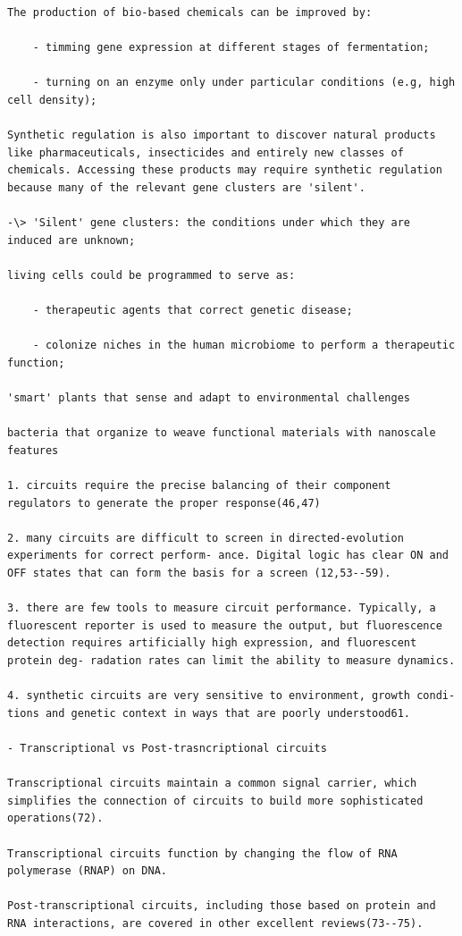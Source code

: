 \documentclass[
]{book}
\begin{document}
\begin{verbatim}
The production of bio-based chemicals can be improved by:

    - timming gene expression at different stages of fermentation;

    - turning on an enzyme only under particular conditions (e.g, high cell density);

Synthetic regulation is also important to discover natural products like pharmaceuticals, insecticides and entirely new classes of chemicals. Accessing these products may require synthetic regulation because many of the relevant gene clusters are 'silent'.

-\> 'Silent' gene clusters: the conditions under which they are induced are unknown;

living cells could be programmed to serve as:

    - therapeutic agents that correct genetic disease;

    - colonize niches in the human microbiome to perform a therapeutic function;

'smart' plants that sense and adapt to environmental challenges

bacteria that organize to weave functional materials with nanoscale features

1. circuits require the precise balancing of their component regulators to generate the proper response(46,47)

2. many circuits are difficult to screen in directed-evolution experiments for correct perform- ance. Digital logic has clear ON and OFF states that can form the basis for a screen (12,53--59).

3. there are few tools to measure circuit performance. Typically, a fluorescent reporter is used to measure the output, but fluorescence detection requires artificially high expression, and fluorescent protein deg- radation rates can limit the ability to measure dynamics.

4. synthetic circuits are very sensitive to environment, growth condi- tions and genetic context in ways that are poorly understood61.

- Transcriptional vs Post-trasncriptional circuits

Transcriptional circuits maintain a common signal carrier, which simplifies the connection of circuits to build more sophisticated operations(72).

Transcriptional circuits function by changing the flow of RNA polymerase (RNAP) on DNA.

Post-transcriptional circuits, including those based on protein and RNA interactions, are covered in other excellent reviews(73--75).
\end{verbatim}
\end{document}
